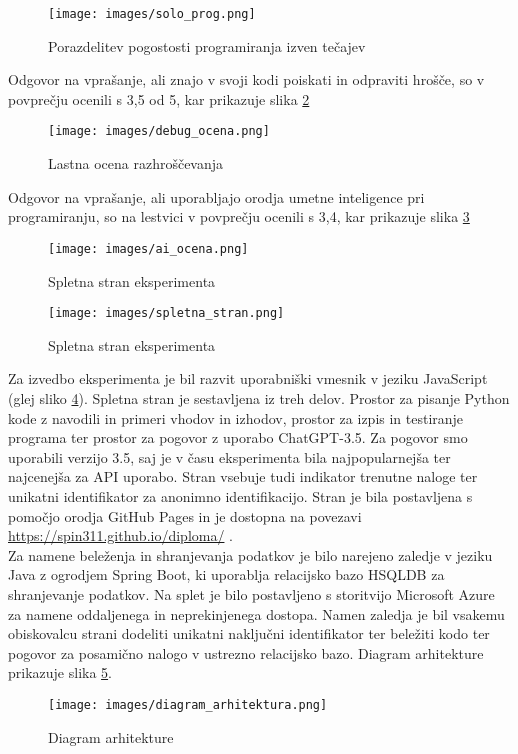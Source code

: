 \documentclass[a4paper,12pt,openright]{book}
\begin{document}
\begin{figure}[H]
    \centering
    \texttt{[image: images/solo\_prog.png]}
    \caption{Porazdelitev pogostosti programiranja izven tečajev}
    \label{fig:solo_prog}
\end{figure}
Odgovor na vprašanje, ali znajo v svoji kodi poiskati in odpraviti hrošče, so v povprečju ocenili s 3,5 od 5, kar prikazuje slika \ref{fig:debug_ocena} \\
\begin{figure}[H]
    \centering
    \texttt{[image: images/debug\_ocena.png]}
    \caption{Lastna ocena razhroščevanja}
    \label{fig:debug_ocena}
\end{figure}
Odgovor na vprašanje, ali uporabljajo orodja umetne inteligence pri programiranju, so na lestvici v povprečju ocenili s 3,4, kar prikazuje slika \ref{fig:ai_ocena}

\begin{figure}[H]
    \centering
    \texttt{[image: images/ai\_ocena.png]}
    \caption{Spletna stran eksperimenta}
    \label{fig:ai_ocena}
\end{figure}



\begin{figure}[H]
    \centering
    \texttt{[image: images/spletna\_stran.png]}
    \caption{Spletna stran eksperimenta}
    \label{fig:spletna_stran}
\end{figure}

Za izvedbo eksperimenta je bil razvit uporabniški vmesnik v jeziku JavaScript (glej sliko \ref{fig:spletna_stran}). Spletna stran je sestavljena iz treh delov. Prostor za pisanje Python kode z navodili in primeri vhodov in izhodov, prostor za izpis in testiranje programa ter prostor za pogovor z uporabo ChatGPT-3.5. Za pogovor smo uporabili verzijo 3.5, saj je v času eksperimenta bila najpopularnejša ter najcenejša za API uporabo. Stran vsebuje tudi indikator trenutne naloge ter unikatni identifikator za anonimno identifikacijo. Stran je bila postavljena s pomočjo orodja GitHub Pages in je dostopna na povezavi \href{https://spin311.github.io/diploma/}{ https://spin311.github.io/diploma/} . \\
Za namene beleženja in shranjevanja podatkov je bilo narejeno zaledje v jeziku Java z ogrodjem Spring Boot, ki uporablja relacijsko bazo HSQLDB za shranjevanje podatkov. Na splet je bilo postavljeno s storitvijo Microsoft Azure za namene oddaljenega in neprekinjenega dostopa. Namen zaledja je bil vsakemu obiskovalcu strani dodeliti unikatni naključni identifikator ter beležiti kodo ter pogovor za posamično nalogo v ustrezno relacijsko bazo. Diagram arhitekture prikazuje slika \ref{fig:arhitektura}. \\
\begin{figure}[H]
    \centering
    \texttt{[image: images/diagram\_arhitektura.png]}
    \caption{Diagram arhitekture}
    \label{fig:arhitektura}
\end{figure}
\end{document}
